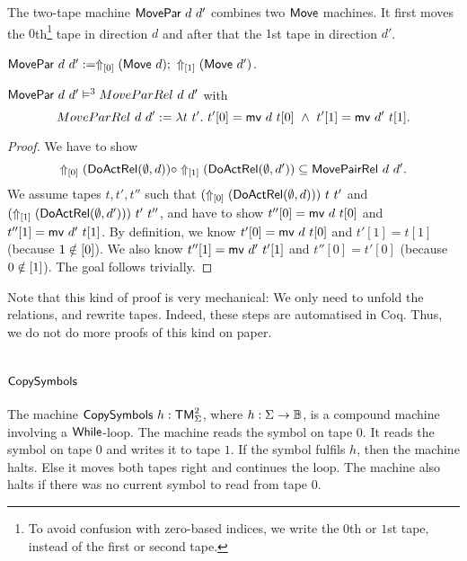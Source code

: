 The two-tape machine $\MS{MovePar}~d~d'$ combines two $\MS{Move}$ machines.  It first moves the $0$th\footnote{To avoid confusion with zero-based
  indices, we write the $0$th or $1$st tape, instead of the first or second tape.} tape in direction $d$ and after that the $1$st tape in
direction $d'$.
\begin{definition}[$\MS{MovePar}$]
  \label{def:MovePar}
  $\MS{MovePar}~d~d' := \LiftTapes{(\MS{Move}~d)}{\Vector{0}} \Seq \LiftTapes{(\MS{Move}~d')}{\Vector{1}}$.
\end{definition}
\begin{lemma}
  \label{lem:MovePar_Sem}
  $\MS{MovePar}~d~d' \vDash^3 MoveParRel~d~d'$ with
  \[ MoveParRel~d~d' := \lambda t~t'.~t'[0]=\MS{mv}~d~t[0] ~\land~ t'[1]=\MS{mv}~d'~t[1]. \]
\end{lemma}
\begin{proof}
  We have to show
  $$
    \LiftTapes{(\MS{DoActRel}(\None,d ))}{\Vector{0}} \circ
    \LiftTapes{(\MS{DoActRel}(\None,d'))}{\Vector{1}} \subseteq
    \MS{MovePairRel}~d~d'.
  $$
  We assume tapes $t, t', t''$ such that $(\LiftTapes{(\MS{DoActRel}(\None,d ))}{\Vector{0}})~t~t'$ and \\
  $(\LiftTapes{(\MS{DoActRel}(\None,d'))}{\Vector{1}})~t'~t''$, and have to show $t''[0]=\MS{mv}~d~t[0]$ and $t''[1]=\MS{mv}~d'~t[1]$.  By definition,
  we know $t'[0]=\MS{mv}~d~t[0]$ and $t'[1]=t[1]$ (because $1 \notin \Vector{0}$).  We also know $t''[1]=\MS{mv}~d'~t'[1]$ and $t''[0]=t'[0]$ (because
  $0 \notin \Vector{1}$).  The goal follows trivially.
\end{proof}
Note that this kind of proof is very mechanical: We only need to unfold the relations, and rewrite tapes.  Indeed, these steps are automatised in Coq.
Thus, we do not do more proofs of this kind on paper.

\section{$\MS{CopySymbols}$}
\label{sec:CopySymbols}

The machine $\MS{CopySymbols}~h : \TM_\Sigma^2$, where $h:\Sigma\to\Bool$, is a compound machine involving a $\While$-loop.  The machine reads the
symbol on tape $0$.  It reads the symbol on tape $0$ and writes it to tape $1$.  If the symbol fulfils $h$, then the machine halts.  Else it moves
both tapes right and continues the loop.  The machine also halts if there was no current symbol to read from tape $0$.

